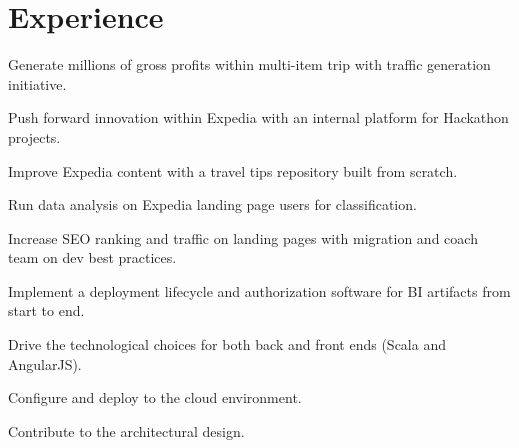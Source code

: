 \documentclass[letterpaper]{deedy-resume} %
\begin{document}
\hfill
%
%
\begin{minipage}[t]{0.66\textwidth} %


\section{Experience}


\vspace{\topsep} %
\begin{tightitemize}
\item Generate millions of gross profits within multi-item trip with traffic generation initiative.
\item Push forward innovation within Expedia with an internal platform for Hackathon projects.
\item Improve Expedia content with a travel tips repository built from scratch.
\item Run data analysis on Expedia landing page users for classification.
\item Increase SEO ranking and traffic on landing pages with migration and coach team on dev best practices.
\end{tightitemize}

\sectionspace %


\begin{tightitemize}
\item Implement a deployment lifecycle and authorization software for BI artifacts from start to end.
\item Drive the technological choices for both back and front ends (Scala and AngularJS).
\item Configure and deploy to the cloud environment.
\item Contribute to the architectural design.
\end{tightitemize}


\end{minipage}
\end{document}
